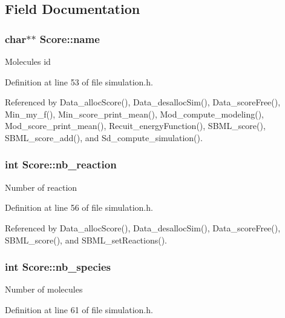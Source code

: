 \subsection{Field Documentation}
\hypertarget{structScore_a29547e98673d89a8964a747015b2c26c}{
\subsubsection[{name}]{\setlength{\rightskip}{0pt plus 5cm}char$\ast$$\ast$ {\bf Score::name}}}
\label{structScore_a29547e98673d89a8964a747015b2c26c}
Molecules id 

Definition at line 53 of file simulation.h.



Referenced by Data\_\-allocScore(), Data\_\-desallocSim(), Data\_\-scoreFree(), Min\_\-my\_\-f(), Min\_\-score\_\-print\_\-mean(), Mod\_\-compute\_\-modeling(), Mod\_\-score\_\-print\_\-mean(), Recuit\_\-energyFunction(), SBML\_\-score(), SBML\_\-score\_\-add(), and Sd\_\-compute\_\-simulation().

\hypertarget{structScore_a9676111bf63c8d420921fe1c9187670d}{
\subsubsection[{nb\_\-reaction}]{\setlength{\rightskip}{0pt plus 5cm}int {\bf Score::nb\_\-reaction}}}
\label{structScore_a9676111bf63c8d420921fe1c9187670d}
Number of reaction 

Definition at line 56 of file simulation.h.



Referenced by Data\_\-allocScore(), Data\_\-desallocSim(), Data\_\-scoreFree(), SBML\_\-score(), and SBML\_\-setReactions().

\hypertarget{structScore_a88d07328145c2565fb2fa50c31760dbe}{
\subsubsection[{nb\_\-species}]{\setlength{\rightskip}{0pt plus 5cm}int {\bf Score::nb\_\-species}}}
\label{structScore_a88d07328145c2565fb2fa50c31760dbe}
Number of molecules 

Definition at line 61 of file simulation.h.



